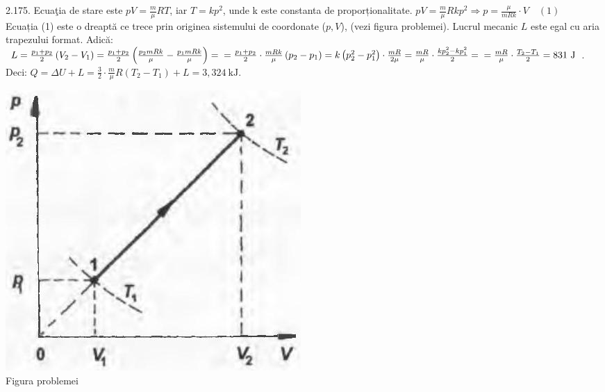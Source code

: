 2.175. Ecuaţia de stare este $p V=\frac{m}{\mu} R T$, iar $T=k p^{2}$, unde k este constanta de proporționalitate. $p V=\frac{m}{\mu} R k p^{2} \Rightarrow p=\frac{\mu}{m R k} \cdot V \quad (1)$\\ Ecuația (1) este o dreaptă ce trece prin originea sistemului de coordonate ($p, V$), (vezi figura problemei). Lucrul mecanic $L$ este egal cu aria trapezului format. Adică:\\ $L=\frac{p_{1}+p_{2}}{2}\left(V_{2}-V_{1}\right)=\frac{p_{1}+p_{2}}{2}\left(\frac{p_{2} m R k}{\mu}-\frac{p_{1} m R k}{\mu}\right)= \\ =\frac{p_{1}+p_{2}}{2} \cdot \frac{m R k}{\mu}\left(p_{2}-p_{1}\right)=k\left(p_{2}^{2}-p_{1}^{2}\right) \cdot \frac{m R}{2 \mu}=\frac{m R}{\mu} \cdot \frac{k p_{2}^{2}-k p_{1}^{2}}{2}= \\ =\frac{m R}{\mu} \cdot \frac{T_{2}-T_{1}}{2}=831 \mathrm{~J}$.\\ Deci: $Q=\Delta U+L=\frac{3}{2} \cdot \frac{m}{\mu} R\left(T_{2}-T_{1}\right)+L=3,324 \mathrm{~kJ}$.\\ \begin{center} \includegraphics[width=0.4\linewidth]{images/2025_07_01_5b3ff9fa0d508c8e9f17g-307(1)}\\ Figura problemei \end{center}\\

